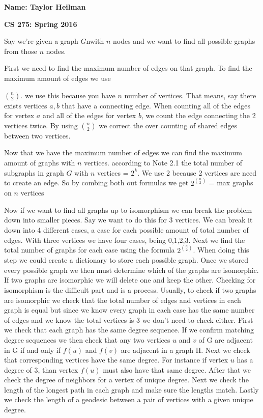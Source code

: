 \documentclass[12pt]{article}
\begin{document}
\textbf{Name: Taylor Heilman}    \hspace{4in} 
\begin{center} \textbf{CS 275: Spring 2016} \end{center}


{

Say we're given a graph $G$nwith $n$ nodes and we want to find all possible graphs from those $n$ nodes.

First we need to find the maximum number of edges on that graph. To find the maximum amount of edges we use

${n \choose 2}$.  we use this because you have $n$ number of vertices.  That means, say there exists vertices $a,b$ that have a connecting edge.  When counting all of the edges for  vertex $a$ and all of the edges for vertex $b$, we count the edge connecting the 2 vertices twice. By using ${n \choose 2}$ we correct the over counting of shared edges between two vertices.

Now that we have the maximum number of edges we can find the maximum amount of graphs with $n$ vertices. according to Note 2.1 the total number of subgraphs in graph $G$ with $n$ vertices = $2^k$.  We use 2 because 2 vertices are need to create an edge.  So by combing both out formulas we get $2^{n \choose 2}$ = max graphs on $n$ vertices

Now if we want to find all graphs up to isomorphism we can break the problem down into smaller pieces.  Say we want to do this for 3 vertices.  We can break it down into 4 different cases, a case for each possible amount of total number of edges. With three vertices we have four cases, being 0,1,2,3.  Next we find the total number of graphs for each case using the formula $2^{n \choose 2}$. When doing this step we could create a dictionary to store each possible graph.  Once we stored every possible graph we then must determine which of the graphs are isomorphic.  If two graphs are isomorphic we will delete one and keep the other. Checking for isomorphism is the difficult part and is a process.  Usually, to check if two graphs are isomorphic we check that the total number of edges and vertices in each graph is equal but since we know every graph in each case has the same number of edges and we know the total vertices is 3 we don't need to check either. First we check that each graph has the same degree sequence. If we confirm matching degree sequences we then check that any two vertices $u$ and $v$ of G are adjacent in G if and only if $f(u)$ and $f(v)$ are adjacent in a graph H. Next we check that corresponding vertices have the same degree. For instance if vertex $u$ has a degree of 3, than vertex $f(u)$ must also have that same degree.  After that we check the degree of neighbors for a vertex of unique degree. Next we check the length of the longest path in each graph and make sure the lengths match.  Lastly we check the length of a geodesic between a pair of vertices with a given unique degree. 

}
\end{document}
